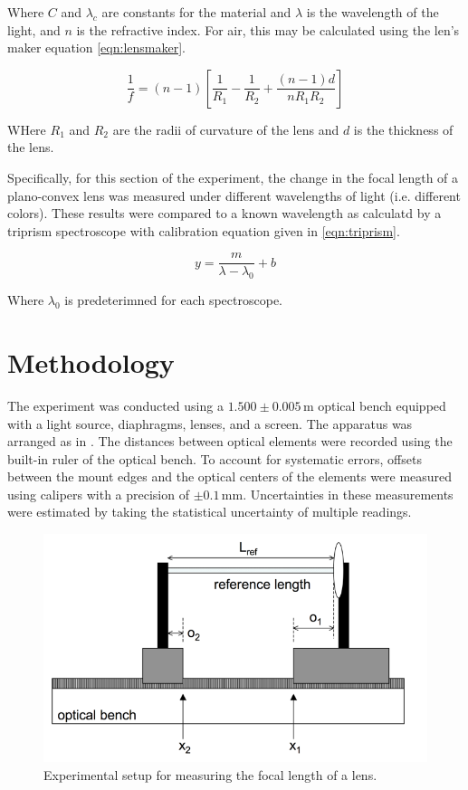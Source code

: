 \documentclass[aip, cp, amsmath, amssymb, reprint, nofootinbib]{revtex4-2}
\begin{document}
        Where $C$ and $\lambda_c$ are constants for the material and $\lambda$ is the wavelength of the light, and $n$ is the refractive index. For air, this may be calculated using the len's maker equation \eqref{eqn:lensmaker}.

        \begin{equation} \label{eqn:lensmaker}
            \frac{1}{f} = (n-1)\left[\frac{1}{R_1} - \frac{1}{R_2} + \frac{(n-1)d}{n R_1 R_2}\right]
        \end{equation}

        WHere $R_1$ and $R_2$ are the radii of curvature of the lens and $d$ is the thickness of the lens. 

        Specifically, for this section of the experiment, the change in the focal length of a plano-convex lens was measured under different wavelengths of light (i.e. different colors). These results were compared to a known wavelength as calculatd by a triprism spectroscope with calibration equation given in \eqref{eqn:triprism}.

        \begin{equation} \label{eqn:triprism}
            y = \frac{m}{\lambda-\lambda_0} + b
        \end{equation}

        Where $\lambda_0$ is predeterimned for each spectroscope.


    \section{Methodology}

        The experiment was conducted using a $1.500\pm0.005\,\text{m}$ optical bench equipped with a light source, diaphragms, lenses, and a screen. The apparatus was arranged as in . The distances between optical elements were recorded using the built-in ruler of the optical bench. To account for systematic errors, offsets between the mount edges and the optical centers of the elements were measured using calipers with a precision of $\pm0.1\,\text{mm}$. Uncertainties in these measurements were estimated by taking the statistical uncertainty of multiple readings.

        \begin{figure}[H]
            \centering
            \includegraphics[width=0.8\linewidth]{figures/optical-bench.png}
            \caption{Experimental setup for measuring the focal length of a lens.}
            \label{fig:expsetup}
        \end{figure}
\end{document}

